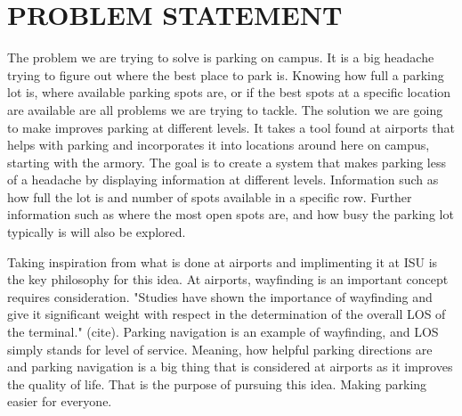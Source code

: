 \documentclass[12pt]{article}
\begin{document}
\section{PROBLEM STATEMENT}
The problem we are trying to solve is parking on campus. It is a big headache trying to figure out where the best place to park is. Knowing how full a parking lot is, where available parking spots are, or if the best spots at a specific location are available are all problems we are trying to tackle. The solution we are going to make improves parking at different levels. It takes a tool found at airports that helps with parking and incorporates it into locations around here on campus, starting with the armory. The goal is to create a system that makes parking less of a headache by displaying information at different levels. Information such as how full the lot is and number of spots available in a specific row. Further information such as where the most open spots are, and how busy the parking lot typically is will also be explored. 

Taking inspiration from what is done at airports and implimenting it at ISU is the key philosophy for this idea. At airports, wayfinding is an important concept requires consideration. "Studies have shown the importance of wayfinding and give it significant weight with respect in the determination of the overall LOS of the terminal." (cite). Parking navigation is an example of wayfinding, and LOS simply stands for level of service. Meaning, how helpful parking directions are and parking navigation is a big thing that is considered at airports as it improves the quality of life. That is the purpose of pursuing this idea. Making parking easier for everyone. 
\end{document}
